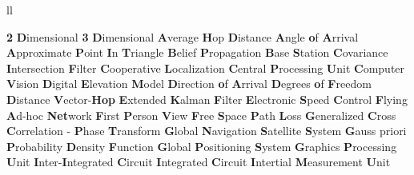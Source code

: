 \begin{abbreviations}{ll} %
    
    			{\textbf{2} \textbf{D}imensional}
    			{\textbf{3} \textbf{D}imensional}
    		{\textbf{A}verage \textbf{H}op \textbf{D}istance} 
    		{\textbf{A}ngle \textbf{o}f \textbf{A}rrival}
    		{\textbf{A}pproximate \textbf{P}oint \textbf{I}n \textbf{T}riangle}
    			{\textbf{B}elief \textbf{P}ropagation} 
    			{\textbf{B}ase \textbf{S}tation}
    		{\textbf{C}ovariance \textbf{I}ntersection \textbf{F}ilter}   
    		    {\textbf{C}ooperative \textbf{L}ocalization}
    		{\textbf{C}entral \textbf{P}rocessing \textbf{U}nit}
    		    {\textbf{C}omputer \textbf{V}ision}
    		{\textbf{D}igital \textbf{E}levation \textbf{M}odel}
    		{\textbf{D}irection \textbf{o}f \textbf{A}rrival}
    		{\textbf{D}egrees \textbf{o}f \textbf{F}reedom}
    		{\textbf{D}istance \textbf{V}ector-\textbf{Hop}}
    		{\textbf{E}xtended \textbf{K}alman \textbf{F}ilter}
    		{\textbf{E}lectronic \textbf{S}peed \textbf{C}ontrol}
    		{\textbf{F}lying \textbf{A}d-hoc \textbf{Net}work}
    		{\textbf{F}irst \textbf{P}erson \textbf{V}iew}
    		{\textbf{F}ree \textbf{S}pace \textbf{P}ath \textbf{L}oss}
    	{\textbf{G}eneralized \textbf{C}ross \textbf{C}orrelation - \textbf{P}hase \textbf{T}ransform}
    		{\textbf{G}lobal \textbf{N}avigation \textbf{S}atellite \textbf{S}ystem}
    		{\textbf{G}auss priori \textbf{P}robability \textbf{D}ensity \textbf{F}unction}
    		{\textbf{G}lobal \textbf{P}ositioning \textbf{S}ystem}
    		{\textbf{G}raphics \textbf{P}rocessing \textbf{U}nit}
    		{\textbf{I}nter-\textbf{I}ntegrated \textbf{C}ircuit}
    			{\textbf{I}ntegrated  \textbf{C}ircuit}
    		{\textbf{I}ntertial \textbf{M}easurement \textbf{U}nit}

\end{abbreviations}
